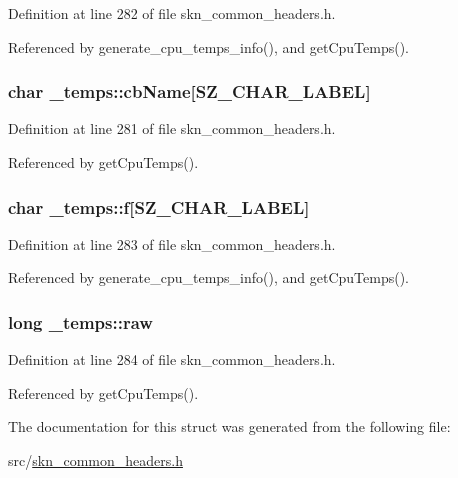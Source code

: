 Definition at line 282 of file skn\+\_\+common\+\_\+headers.\+h.



Referenced by generate\+\_\+cpu\+\_\+temps\+\_\+info(), and get\+Cpu\+Temps().

\hypertarget{struct__temps_a74414216b43459f4ebcada36b9b165f5}{
\subsubsection[{cb\+Name}]{\setlength{\rightskip}{0pt plus 5cm}char \+\_\+temps\+::cb\+Name\mbox{[}{\bf S\+Z\+\_\+\+C\+H\+A\+R\+\_\+\+L\+A\+B\+E\+L}\mbox{]}}}\label{struct__temps_a74414216b43459f4ebcada36b9b165f5}


Definition at line 281 of file skn\+\_\+common\+\_\+headers.\+h.



Referenced by get\+Cpu\+Temps().

\hypertarget{struct__temps_a9de7d7f00c6df40b61735f25e3247b40}{
\subsubsection[{f}]{\setlength{\rightskip}{0pt plus 5cm}char \+\_\+temps\+::f\mbox{[}{\bf S\+Z\+\_\+\+C\+H\+A\+R\+\_\+\+L\+A\+B\+E\+L}\mbox{]}}}\label{struct__temps_a9de7d7f00c6df40b61735f25e3247b40}


Definition at line 283 of file skn\+\_\+common\+\_\+headers.\+h.



Referenced by generate\+\_\+cpu\+\_\+temps\+\_\+info(), and get\+Cpu\+Temps().

\hypertarget{struct__temps_a62d3522782b91f7fbb444bceb91c1876}{
\subsubsection[{raw}]{\setlength{\rightskip}{0pt plus 5cm}long \+\_\+temps\+::raw}}\label{struct__temps_a62d3522782b91f7fbb444bceb91c1876}


Definition at line 284 of file skn\+\_\+common\+\_\+headers.\+h.



Referenced by get\+Cpu\+Temps().



The documentation for this struct was generated from the following file\+:\begin{DoxyCompactItemize}
\item 
src/\hyperlink{skn__common__headers_8h}{skn\+\_\+common\+\_\+headers.\+h}\end{DoxyCompactItemize}
